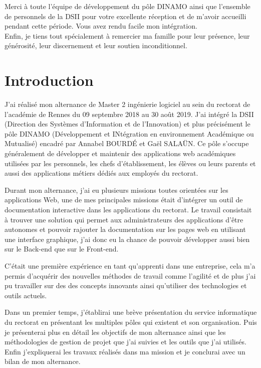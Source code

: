 \documentclass[12pt]{article}
\begin{document}
Merci à toute l'équipe de développement du pôle DINAMO ainsi que l'ensemble de personnels de la DSII pour votre excellente réception et de m'avoir accueilli pendant cette période. Vous avez rendu facile mon intégration. \\

Enfin, je tiens tout spécialement à remercier ma famille pour leur présence, leur générosité, leur discernement et leur soutien inconditionnel. 

\newpage


\section{Introduction}

J'ai réalisé mon alternance de Master 2 ingénierie logiciel au sein du rectorat de l'académie de Rennes du 09 septembre 2018 au 30 août 2019. J'ai intégré la DSII (Direction des Systèmes d'Information et de l'Innovation) et plus précisément le pôle DINAMO (Développement et INtégration en environnement Académique ou Mutualisé) encadré par Annabel BOURDÉ et Gaël SALAÜN. Ce pôle s'occupe généralement de développer et maintenir des applications web académiques utilisées par les personnels, les chefs d'établissement, les élèves  ou leurs parents et aussi des applications métiers dédiés aux employés du rectorat.\newline


Durant mon alternance, j'ai eu plusieurs missions toutes orientées sur les  applications Web, une de mes principales missions était d'intégrer un outil de documentation interactive dans les applications du rectorat. Le travail consistait à trouver une solution qui permet aux administrateurs des applications d'être autonomes et pouvoir rajouter la documentation sur les pages web en utilisant une interface graphique, j'ai donc eu la chance de pouvoir développer aussi bien sur le Back-end que sur le Front-end.\newline   

C'était une première expérience en tant qu'apprenti dans une entreprise, cela m'a permis d'acquérir des nouvelles méthodes de travail comme l'agilité et de plus j'ai pu travailler sur des des concepts innovants ainsi qu'utiliser des technologies et outils actuels.\newline


Dans un premier temps, j'établirai une brève présentation du service informatique du rectorat en présentant les multiples pôles qui existent et son organisation. Puis je présenterai plus en détail les objectifs de mon alternance ainsi que les méthodologies de gestion de projet que j'ai suivies et les outils que j'ai utilisés. Enfin j'expliquerai les travaux réalisés dans ma mission et je conclurai avec un bilan de mon alternance.
\end{document}
